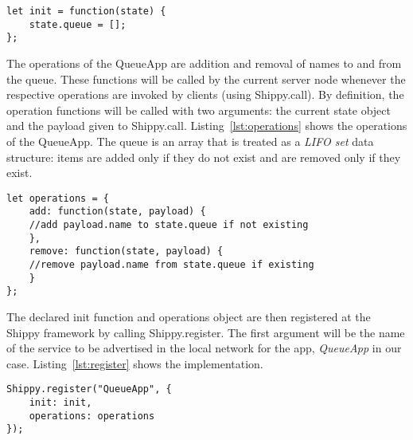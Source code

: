 \begin{lstlisting}[caption={QueueApp init function},label={lst:init}]
let init = function(state) {
    state.queue = [];
};
\end{lstlisting}

The operations of the QueueApp are addition and removal of names to and from the queue.
These functions will be called by the current server node whenever the respective operations are invoked by clients (using {\ttfamily Shippy.call}).
By definition, the operation functions will be called with two arguments: the current {\ttfamily state} object and the {\ttfamily payload} given to {\ttfamily Shippy.call}.
Listing~\ref{lst:operations} shows the operations of the QueueApp.
The queue is an array that is treated as a \textit{LIFO set} data structure: items are added only if they do not exist and are removed only if they exist.

\begin{lstlisting}[caption={QueueApp operations},label={lst:operations}]
let operations = {
    add: function(state, payload) {
    //add payload.name to state.queue if not existing
    },
    remove: function(state, payload) {
    //remove payload.name from state.queue if existing
    }
};
\end{lstlisting}

The declared {\ttfamily init} function and {\ttfamily operations} object are then registered at the Shippy framework by calling {\ttfamily Shippy.register}.
The first argument will be the name of the service to be advertised in the local network for the app, \textit{QueueApp} in our case.
Listing~\ref{lst:register} shows the implementation.

\begin{lstlisting}[caption={Call to Shippy.register},label={lst:register}]
Shippy.register("QueueApp", {
    init: init,
    operations: operations
});
\end{lstlisting}